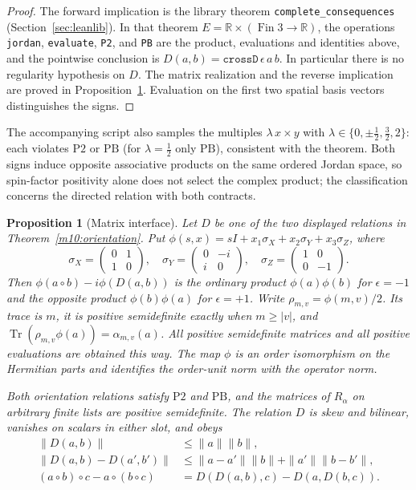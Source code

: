 \documentclass[11pt,reqno]{amsart}
\newtheorem{proposition}[theorem]{Proposition}
\theoremstyle{definition}
\theoremstyle{remark}
\numberwithin{equation}{section}
\newcommand{\R}{\mathbb{R}}
\begin{document}
\begin{proof}
The forward implication is the library theorem
\texttt{complete\_consequences} \cite{Tru} (Section~\ref{sec:leanlib}).
In that theorem \(E=\R\times(\operatorname{Fin}3\to\R)\), the
operations \texttt{jordan}, \texttt{evaluate}, \texttt{P2}, and
\texttt{PB} are the product, evaluations and identities above,
and the pointwise conclusion is \(D(a,b)=\texttt{crossD}\,
\epsilon\,a\,b\). In particular there is no regularity
hypothesis on \(D\). The matrix realization and the reverse
implication are proved in Proposition~\ref{m10:pauli}. Evaluation
on the first two spatial basis vectors distinguishes the signs.
\end{proof}

The accompanying script also samples the multiples \(\lambda\,x\times y\)
with \(\lambda\in\{0,\pm\tfrac12,\tfrac32,2\}\): each violates
\(\mathrm{P2}\) or \(\mathrm{PB}\) (for \(\lambda=\tfrac12\) only
\(\mathrm{PB}\)), consistent with the theorem. Both signs induce
opposite associative products on the same ordered Jordan space, so
spin-factor positivity alone does not select the complex product; the
classification concerns the directed relation with both contracts.

\begin{proposition}[Matrix interface]\label{m10:pauli}
Let \(D\) be one of the two displayed relations in
Theorem~\ref{m10:orientation}. Put
\(\phi(s,x)=sI+x_1\sigma_X+x_2\sigma_Y+x_3\sigma_Z\), where
\[
 \sigma_X=\begin{pmatrix}0&1\\1&0\end{pmatrix},\quad
 \sigma_Y=\begin{pmatrix}0&-i\\i&0\end{pmatrix},\quad
 \sigma_Z=\begin{pmatrix}1&0\\0&-1\end{pmatrix}.
\]
Then \(\phi(a\circ b)-i\phi(D(a,b))\) is the ordinary product
\(\phi(a)\phi(b)\) for \(\epsilon=-1\) and the opposite product
\(\phi(b)\phi(a)\) for \(\epsilon=+1\). Write
\(\rho_{m,v}=\phi(m,v)/2\). Its trace is \(m\), it is positive
semidefinite exactly when \(m\ge |v|\), and
\(\operatorname{Tr}(\rho_{m,v}\phi(a))=\alpha_{m,v}(a)\).
All positive semidefinite matrices and all positive evaluations
are obtained this way. The map \(\phi\) is an order isomorphism
on the Hermitian parts and identifies the order-unit norm with
the operator norm.

Both orientation relations satisfy \(\mathrm{P2}\) and
\(\mathrm{PB}\), and the matrices of \(R_\alpha\) on arbitrary
finite lists are positive semidefinite. The relation \(D\)
is skew and bilinear, vanishes on scalars in either slot, and
obeys
\[
\begin{split}
 \|D(a,b)\|&\le \|a\|\|b\|,\\
 \|D(a,b)-D(a',b')\|&\le
 \|a-a'\|\|b\|+\|a'\|\|b-b'\|,\\
 (a\circ b)\circ c-a\circ(b\circ c)
 &=D(D(a,b),c)-D(a,D(b,c)).
\end{split}
\]
\end{proposition}
\end{document}
